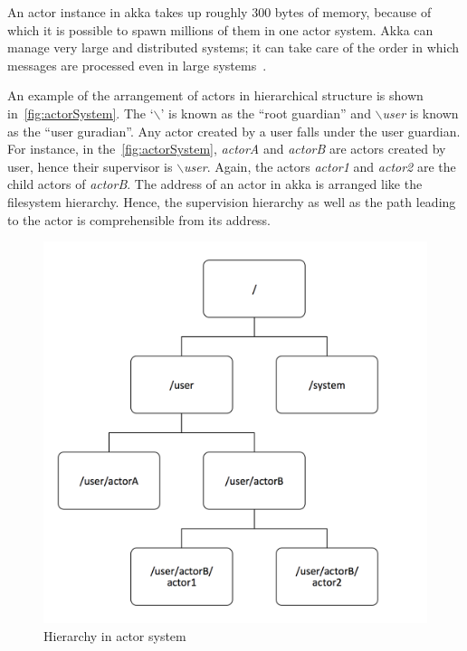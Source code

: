   An actor instance in akka takes up roughly 300 bytes of memory, because of which it is possible to spawn millions of them in one actor system. Akka can manage very large and distributed systems; it can take care of the order in which messages are processed even in large systems~\cite{akkaJavaDoc}.

  An example of the arrangement of actors in hierarchical structure is shown in~\autoref{fig:actorSystem}. The ‘{$\backslash$}’ is known as the “root guardian” and \emph{$\backslash$user} is known as the “user guradian”. Any actor created by a user falls under the user guardian. For instance, in the~\autoref{fig:actorSystem}, \emph{actorA} and \emph{actorB} are actors created by user, hence their supervisor is \emph{$\backslash$user}. Again, the actors \emph{actor1} and \emph{actor2} are the child actors of \emph{actorB}. The address of an actor in akka is arranged like the filesystem hierarchy. Hence, the supervision hierarchy as well as the path leading to the actor is comprehensible from its address.

\begin{figure}[H]
  \centering
  \includegraphics[scale=0.5]{figures/actorSystem}
  \caption[Hierarchy in actor system]{Hierarchy in actor system~\cite{akkaJavaDoc}}
  \label{fig:actorSystem}
\end{figure}

